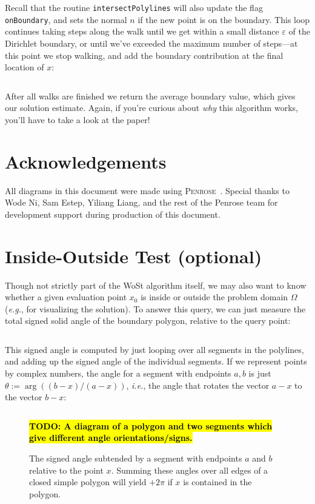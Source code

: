 \documentclass{article}
\newcommand{\code}[1]{\texttt{\small{#1}}}
\newcommand{\todo}[1]{\textbf{\hl{TODO: #1}}}
\newcommand{\eg}{\emph{e.g.}} %
\newcommand{\ie}{\emph{i.e.}} %
\renewcommand{\vec}[1]{#1}
\begin{document}
Recall that the routine \code{intersectPolylines} will also update the flag \code{onBoundary}, and sets the normal \(n\) if the new point is on the boundary.  This loop continues taking steps along the walk until we get within a small distance \(\varepsilon\) of the Dirichlet boundary, or until we've exceeded the maximum number of steps---at this point we stop walking, and add the boundary contribution at the final location of \(\vec{x}\):

\inputminted[fontsize=\small,linenos,firstline=151,lastline=159,bgcolor=bg]{cpp}{../code/WoStLaplace2D.cpp}

After all walks are finished we return the average boundary value, which gives our solution estimate.  Again, if you're curious about \emph{why} this algorithm works, you'll have to take a look at the paper!

\section*{Acknowledgements} All diagrams in this document were made using \textsc{Penrose}~\citep{Ye:2020:PFM}.  Special thanks to Wode Ni, Sam Estep, Yiliang Liang, and the rest of the Penrose team for development support during production of this document.




\appendix

\section{Inside-Outside Test (optional)}
\label{sec:InsideOutsideTest}

Though not strictly part of the WoSt algorithm itself, we may also want to know whether a given evaluation point \(\vec{x}_0\) is inside or outside the problem domain \(\Omega\) (\eg, for visualizing the solution).  To answer this query, we can just measure the total signed solid angle of the boundary polygon, relative to the query point:

\inputminted[fontsize=\small,linenos,firstline=191,lastline=202,bgcolor=bg]{cpp}{../code/WoStLaplace2D.cpp}

This signed angle is computed by just looping over all segments in the polylines, and adding up the signed angle of the individual segments.  If we represent points by complex numbers, the angle for a segment with endpoints \(\vec{a},\vec{b}\) is just \(\theta := \arg((\vec{b}-\vec{x})/(\vec{a}-\vec{x}))\), \ie, the angle that rotates the vector \(\vec{a}-\vec{x}\) to the vector \(\vec{b}-\vec{x}\):

\inputminted[fontsize=\small,linenos,firstline=182,lastline=189,bgcolor=bg]{cpp}{../code/WoStLaplace2D.cpp}

\begin{figure}[h!]
   \todo{A diagram of a polygon and two segments which give different angle orientations/signs.}
   \caption{The signed angle subtended by a segment with endpoints \(\vec{a}\) and \(\vec{b}\) relative to the point \(\vec{x}\).  Summing these angles over all edges of a closed simple polygon will yield \(+2\pi\) if \(\vec{x}\) is contained in the polygon.}
\end{figure}
\end{document}
